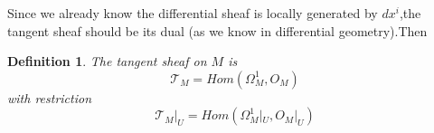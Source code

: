 \documentclass[a4paper,12pt]{article}
\theoremstyle{mystyle}
\theoremstyle{mystyle}
\newtheorem{definition}{\color{blue} Definition}
\numberwithin{equation}{section}
\begin{document}
	Since we already know the differential sheaf is locally generated by $dx^i$,the tangent sheaf should be its dual (as we know in differential geometry).Then
	\begin{definition}
		The tangent sheaf on $M$ is
		$$\mathcal{T}_M=Hom(\Omega_M^1,O_M)$$
		with restriction
		$$\mathcal{T}_M|_{U}=Hom(\Omega_M^1|_{U},O_M|_{U})$$
	\end{definition}
\end{document}
